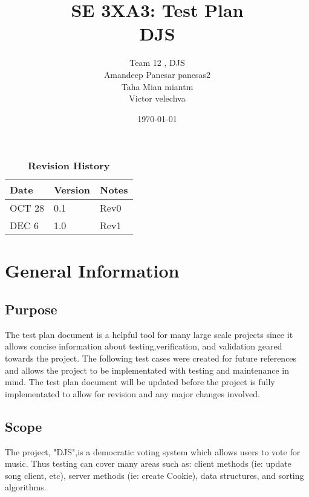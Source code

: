 \documentclass[12pt, titlepage]{article}
\title{SE 3XA3: Test Plan\\DJS}
\author{Team 12 , DJS
		\\ Amandeep Panesar panesas2
		\\ Taha Mian miantm
		\\ Victor velechva
}
\date{\today}
\begin{document}
\newcommand{\acceptableRating}{\textcolor{blue}{7.5 }}
\newcommand{\numberOfSongs}{\textcolor{blue}{5 }}
\newcommand{\numberOfStressTestClients}{\textcolor{blue}{300 }}

\maketitle

\tableofcontents
\listoftables
\listoffigures

\begin{table}[bp]
\caption{\bf Revision History}
\begin{tabularx}{\textwidth}{p{3cm}p{2cm}X}
\toprule {\bf Date} & {\bf Version} & {\bf Notes}\\
\midrule
OCT 28 & 0.1 & Rev0\\
DEC 6 & 1.0 & Rev1\\

\bottomrule
\end{tabularx}
\end{table}

\newpage


\section{General Information}

\subsection{Purpose}
The test plan document is a helpful tool for many large scale projects since it allows concise information about testing,verification, and validation geared towards the project. The following test cases were created for future references and allows the project to be implementated with testing and maintenance in mind. The test plan document will be updated before the project is fully implementated to allow for revision and any major changes involved.

\subsection{Scope}
The project, "DJS",is a democratic voting system which allows users to vote for music. Thus testing can cover many areas such as: client methods (ie: update song client, etc), server methods (ie: create Cookie), data structures, and sorting algorithms.
\end{document}
